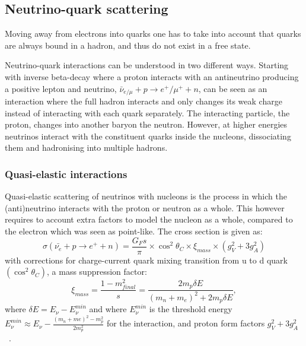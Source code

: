 \subsection{Neutrino-quark scattering}
Moving away from electrons into quarks one has to take into account that quarks are always bound in a hadron, and thus do not exist in a free state. 

Neutrino-quark interactions can be understood in two different ways. Starting with inverse beta-decay where a proton interacts with an antineutrino producing a positive lepton and neutrino, $\bar{\nu}_{e/\mu} + p \rightarrow  e^+/\mu^+ + n$, can be seen as an interaction where the full hadron interacts and only changes its weak charge instead of interacting with each quark separately. The interacting particle, the proton, changes into another baryon the neutron. However, at higher energies neutrinos interact with the constituent quarks inside the nucleons, dissociating them and hadronising into multiple hadrons.


\subsubsection{Quasi-elastic interactions}
Quasi-elastic scattering of neutrinos with nucleons is the process in which the (anti)neutrino interacts with the proton or neutron as a whole.
This however requires to account extra factors to model the nucleon as a whole, compared to the electron which was seen as point-like. The cross section is given as:
\begin{equation}
\sigma(\bar{\nu_e} + p \rightarrow e^+ + n) = \frac{G_Fs}{\pi} \times \cos^2 \theta_C \times \xi_{mass} \times (g^2_V + 3 g^2_A)
\end{equation}
with corrections for charge-current quark mixing transition from u to d quark $( \cos^2 \theta_C)$, a mass suppression factor:
\begin{equation}
\xi_{mass}=\frac{1-m^2_{final}}{s} = \frac{2m_p \delta E}{(m_n+m_e)^2+2m_p \delta E},
\end{equation}  
where $\delta E = E_\nu - E_\nu^{min}$ and where $E_\nu ^{min}$ is the threshold energy $E_\nu ^{min} \approx E_\nu - \frac{(m_n+me)^2 - m_p^2}{2m_p^2}$  for the interaction, and proton form factors $g^2_V + 3 g^2_A$ ~\cite{47Soler}.

